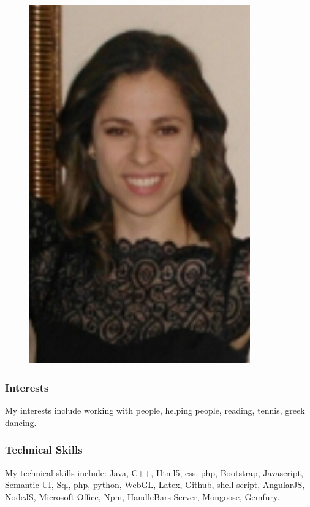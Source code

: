 \documentclass[hidelinks, 12pt, oneside]{article}
\begin{document}
\begin{figure}[h!]
  \centering
    \includegraphics[width=0.85\textwidth]{t} 
\end{figure}

\subsubsection{Interests}
My interests include working with people, helping people, reading, tennis, greek dancing. 
\subsubsection{Technical Skills}
My technical skills include: Java, C++, Html5, css, php, Bootstrap, Javascript, Semantic UI, Sql, php, python,  WebGL, Latex, Github, shell script, AngularJS, NodeJS, Microsoft Office, Npm, HandleBars Server, Mongoose, Gemfury. 
\end{document}
